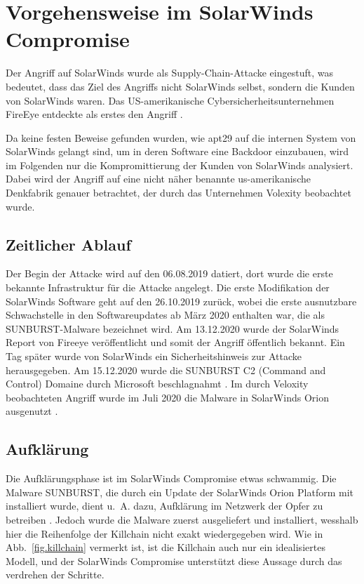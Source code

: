 \documentclass[conference]{IEEEtran}
\begin{document}
\section{Vorgehensweise im SolarWinds Compromise}

Der Angriff auf SolarWinds wurde als Supply-Chain-Attacke eingestuft, was bedeutet, dass das Ziel des Angriffs nicht SolarWinds selbst, sondern die Kunden von SolarWinds waren.
Das US-amerikanische Cybersicherheitsunternehmen FireEye entdeckte als erstes den Angriff \cite{9579611}.

Da keine festen Beweise gefunden wurden, wie \ac{apt}29 auf die internen System von SolarWinds gelangt sind, um in deren Software eine Backdoor einzubauen, wird im Folgenden nur die Kompromittierung der Kunden von SolarWinds analysiert.
Dabei wird der Angriff auf eine nicht näher benannte us-amerikanische Denkfabrik genauer betrachtet, der durch das Unternehmen Volexity beobachtet wurde.

\subsection{Zeitlicher Ablauf}
Der Begin der Attacke wird auf den 06.08.2019 datiert, dort wurde die erste bekannte Infrastruktur für die Attacke angelegt.
Die erste Modifikation der SolarWinds Software geht auf den 26.10.2019 zurück, wobei die erste ausnutzbare Schwachstelle in den Softwareupdates ab März 2020 enthalten war, die als SUNBURST-Malware bezeichnet wird.
Am 13.12.2020 wurde der SolarWinds Report von Fireeye veröffentlicht und somit der Angriff öffentlich bekannt.
Ein Tag später wurde von SolarWinds ein Sicherheitshinweis zur Attacke herausgegeben.
Am 15.12.2020 wurde die SUNBURST C2 (Command and Control) Domaine durch Microsoft beschlagnahmt \cite{Unit2020}.
Im durch Veloxity beobachteten Angriff wurde im Juli 2020 die Malware in SolarWinds Orion ausgenutzt \cite{Cash2020}.

\subsection{Aufklärung}
Die Aufklärungsphase ist im SolarWinds Compromise etwas schwammig.
Die Malware SUNBURST, die durch ein Update der SolarWinds Orion Platform mit installiert wurde, dient u.~A. dazu, Aufklärung im Netzwerk der Opfer zu betreiben \cite{Intelligence2020}.
Jedoch wurde die Malware zuerst ausgeliefert und installiert, wesshalb hier die Reihenfolge der Killchain nicht exakt wiedergegeben wird.
Wie in Abb.~\ref{fig.killchain} vermerkt ist, ist die Killchain auch nur ein idealisiertes Modell, und der SolarWinds Compromise unterstützt diese Aussage durch das verdrehen der Schritte.
\end{document}
